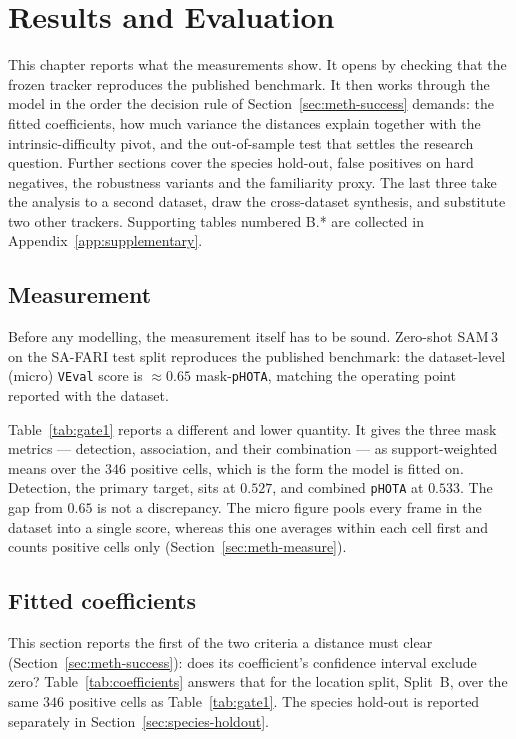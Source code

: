 \chapter{Results and Evaluation}
\label{ch:results}


This chapter reports what the measurements show. It opens by checking that the frozen tracker reproduces the
published benchmark. It then works through the model in the order the decision rule of
Section~\ref{sec:meth-success} demands: the fitted coefficients, how much variance the distances explain
together with the intrinsic-difficulty pivot, and the out-of-sample test that settles the research question.
Further sections cover the species hold-out, false positives on hard negatives, the robustness variants and
the familiarity proxy. The last three take the analysis to a second dataset, draw the cross-dataset synthesis,
and substitute two other trackers. Supporting tables numbered B.* are collected in
Appendix~\ref{app:supplementary}.

\section{Measurement}
\label{sec:measurement}
Before any modelling, the measurement itself has to be sound. Zero-shot SAM\,3 on the SA-FARI test split
reproduces the published benchmark: the dataset-level (micro) \texttt{VEval} score is $\approx\!0.65$
mask-\texttt{pHOTA}, matching the operating point reported with the dataset.

Table~\ref{tab:gate1} reports a different and lower quantity. It gives the three mask metrics --- detection,
association, and their combination --- as support-weighted means over the $346$ positive cells, which is the
form the model is fitted on. Detection, the primary target, sits at $0.527$, and combined \texttt{pHOTA} at
$0.533$. The gap from $0.65$ is not a discrepancy. The micro figure pools every frame in the dataset into a
single score, whereas this one averages within each cell first and counts positive cells only
(Section~\ref{sec:meth-measure}).

\section{Fitted coefficients}
\label{sec:coefficients}
This section reports the first of the two criteria a distance must clear (Section~\ref{sec:meth-success}): does
its coefficient's confidence interval exclude zero? Table~\ref{tab:coefficients} answers that for the location
split, Split~B, over the same $346$ positive cells as Table~\ref{tab:gate1}. The species hold-out is reported
separately in Section~\ref{sec:species-holdout}.

